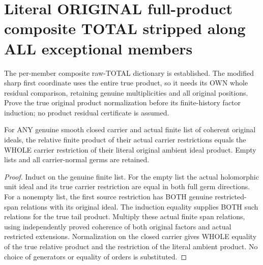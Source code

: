 \section{Literal ORIGINAL full-product composite TOTAL stripped along ALL exceptional members}

The per-member composite raw-TOTAL dictionary is established. The modified
sharp first coordinate uses the entire true product, so it needs its OWN
whole residual comparison, retaining genuine multiplicities and all
original positions. Prove the true original product normalization before
its finite-history factor induction; no product residual certificate is
assumed.

\begin{lemma}
\label{hir:sharp-actual-initial-relative-product-original-whole-normalization}
\leanok
For ANY genuine smooth closed carrier and actual finite list of coherent
original ideals, the relative finite product of their actual carrier
restrictions equals the WHOLE carrier restriction of their literal
original ambient ideal product. Empty lists and all carrier-normal germs
are retained.
\end{lemma}
\begin{proof}
Induct on the genuine finite list. For the empty list the actual
holomorphic unit ideal and its true carrier restriction are equal in both
full germ directions. For a nonempty list, the first source restriction
has BOTH genuine restricted-span relations with its original ideal.
The induction equality supplies BOTH such relations for the true tail
product. Multiply these actual finite span relations, using independently
proved coherence of both original factors and actual restricted
extensions. Normalization on the closed carrier gives WHOLE equality of
the true relative product and the restriction of the literal ambient
product. No choice of generators or equality of orders is substituted.
\end{proof}

